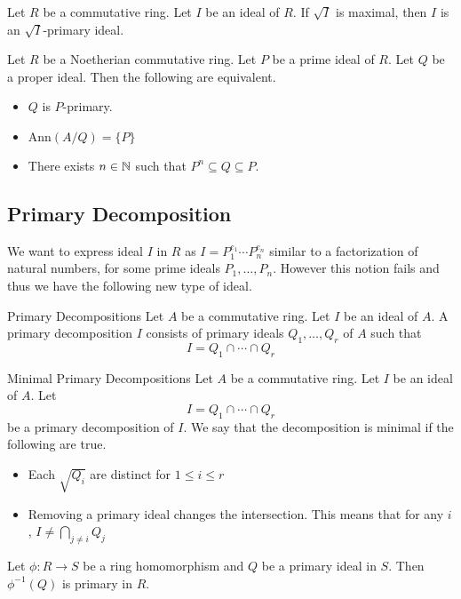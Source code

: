 \documentclass[a4paper]{article}
\begin{document}
\begin{prp}{}{} Let $R$ be a commutative ring. Let $I$ be an ideal of $R$. If $\sqrt{I}$ is maximal, then $I$ is an $\sqrt{I}$-primary ideal. 
\end{prp}

\begin{prp}{}{} Let $R$ be a Noetherian commutative ring. Let $P$ be a prime ideal of $R$. Let $Q$ be a proper ideal. Then the following are equivalent. 
\begin{itemize}
\item $Q$ is $P$-primary. 
\item $\text{Ann}(A/Q)=\{P\}$
\item There exists $n\in\mathbb{N}$ such that $P^n\subseteq Q\subseteq P$. 
\end{itemize}
\end{prp}

\subsection{Primary Decomposition}
We want to express ideal $I$ in $R$ as $I=P_1^{e_1}\cdots P_n^{e_n}$ similar to a factorization of natural numbers, for some prime ideals $P_1,\dots,P_n$. However this notion fails and thus we have the following new type of ideal. 

\begin{defn}{Primary Decompositions}{} Let $A$ be a commutative ring. Let $I$ be an ideal of $A$. A primary decomposition $I$ consists of primary ideals $Q_1,\dots,Q_r$ of $A$ such that $$I=Q_1\cap\cdots\cap Q_r$$
\end{defn}

\begin{defn}{Minimal Primary Decompositions}{} Let $A$ be a commutative ring. Let $I$ be an ideal of $A$. Let $$I=Q_1\cap\cdots\cap Q_r$$ be a primary decomposition of $I$. We say that the decomposition is minimal if the following are true. 
\begin{itemize}
\item Each $\sqrt{Q_i}$ are distinct for $1\leq i\leq r$
\item Removing a primary ideal changes the intersection. This means that for any $i$, $I\neq\bigcap_{j\neq i}Q_j$
\end{itemize}
\end{defn}

\begin{lmm}{}{} Let $\phi:R\to S$ be a ring homomorphism and $Q$ be a primary ideal in $S$. Then $\phi^{-1}(Q)$ is primary in $R$. 
\end{lmm}
\end{document}
